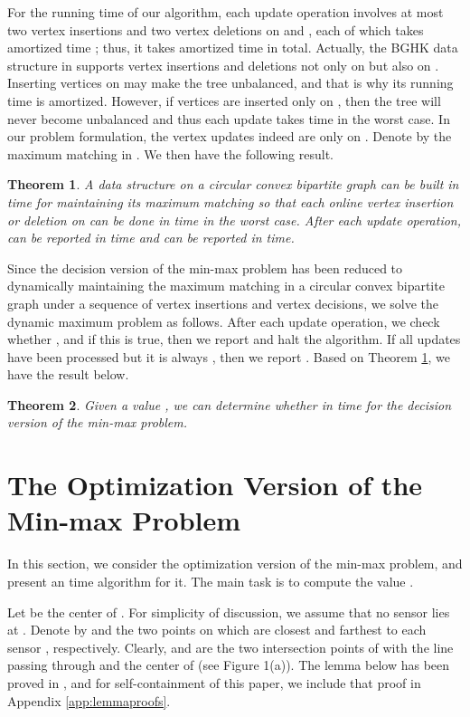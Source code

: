 \documentclass[11pt]{article}
\newtheorem{Theo}{Theorem}
\begin{document}
For the running time of our algorithm, each update operation involves
at most two vertex insertions and two vertex deletions on  and
, each of which takes  amortized time
\cite{ref:BrodalDy07}; thus, it takes  amortized time in total.
Actually, the BGHK data structure in \cite{ref:BrodalDy07} supports
vertex insertions and deletions not only on  but also on .
Inserting vertices on  may make the tree unbalanced, and that is why its
running time is amortized. However, if vertices are inserted only on
, then the tree will never become unbalanced and thus each update takes 
time in the worst case. In our
problem formulation, the vertex updates indeed are only on .
Denote by  the maximum matching in . We then have the following result.


\begin{Theo}\label{theo:10}
A data structure on a circular convex bipartite graph
 can be built in  time for
maintaining its maximum matching  so that each online
vertex insertion or deletion on  can be done in  time in the
worst case. After each update operation,  can be reported in
 time and  can be reported in  time.
\end{Theo}

Since the decision version of the min-max problem
has been reduced to dynamically maintaining the maximum matching
in a circular convex bipartite graph
under a sequence of  vertex insertions and  vertex decisions,
we solve the dynamic maximum problem as follows.  After each update
operation, we check whether , and if this is true, then we report
 and halt the algorithm. If all  updates have
been processed but it is always , then we report
.  Based on Theorem \ref{theo:10}, we have the result below.

\begin{Theo}\label{theo:20}
Given a value , we can determine whether
 in  time for the decision version
of the min-max problem.
\end{Theo}

\section{The Optimization Version of the Min-max Problem}
\label{sec:optimization}

In this section, we consider the optimization version of the min-max
problem, and present an  time algorithm for it.
The main task is to compute the value .

Let  be the center of . For simplicity of discussion, we assume that no sensor
lies at .
Denote by  and  the two points on  which are closest
and farthest to each sensor , respectively.
Clearly,  and  are the two intersection
points of  with the line passing through  and the center 
of  (see Figure 1(a)). The lemma below has been proved in
\cite{ref:TanNe10}, and for self-containment of this paper, we include that proof in
Appendix \ref{app:lemmaproofs}.
\end{document}
